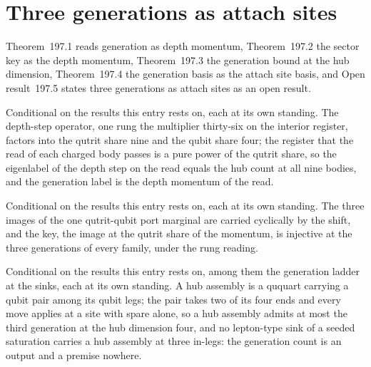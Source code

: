 \section{Three generations as attach sites}\label{mod:VIII-4-three-generations-as-attach-sites}
\label{narr:open:8-4}Theorem~197.1 reads generation as depth momentum, Theorem~197.2 the sector key as the depth momentum, Theorem~197.3 the generation bound at the hub dimension, Theorem~197.4 the generation basis as the attach site basis, and Open result~197.5 states three generations as attach sites as an open result.
\begin{chconditional}\label{box:VIII-4-three-generations-as-attach-sites:1}
Conditional on the results this entry rests on, each at its own standing. The depth-step operator, one rung the multiplier thirty-six on the interior register, factors into the qutrit share nine and the qubit share four; the register that the read of each charged body passes is a pure power of the qutrit share, so the eigenlabel of the depth step on the read equals the hub count at all nine bodies, and the generation label is the depth momentum of the read.
\end{chconditional}
\begin{chconditional}\label{box:VIII-4-three-generations-as-attach-sites:2}
Conditional on the results this entry rests on, each at its own standing. The three images of the one qutrit-qubit port marginal are carried cyclically by the shift, and the key, the image at the qutrit share of the momentum, is injective at the three generations of every family, under the rung reading.
\end{chconditional}
\begin{chconditional}\label{box:VIII-4-three-generations-as-attach-sites:3}
Conditional on the results this entry rests on, among them the generation ladder at the sinks, each at its own standing. A hub assembly is a ququart carrying a qubit pair among its qubit legs; the pair takes two of its four ends and every move applies at a site with spare alone, so a hub assembly admits at most the third generation at the hub dimension four, and no lepton-type sink of a seeded saturation carries a hub assembly at three in-legs: the generation count is an output and a premise nowhere.
\end{chconditional}
